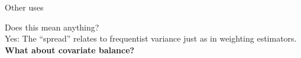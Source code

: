 
\begin{frame}[c]{Other uses}
\centering


Does this mean anything?\\
Yes: The ``spread'' relates to frequentist variance just as in weighting estimators.\\[1em]

{
\textbf{What about covariate balance?}
}

\AlexanderWeightPlot{}

\end{frame}
